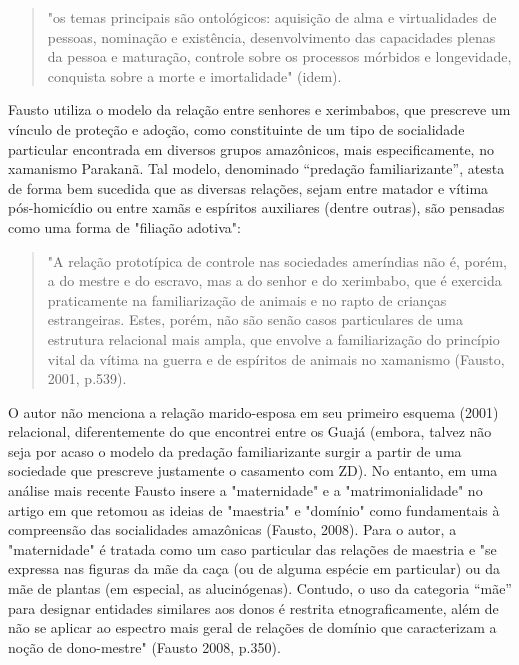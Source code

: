 \begin{quote}
"os temas principais são ontológicos: aquisição de alma e virtualidades
de pessoas, nominação e existência, desenvolvimento das capacidades
plenas da pessoa e maturação, controle sobre os processos mórbidos e
longevidade, conquista sobre a morte e imortalidade" (idem).
\end{quote}

Fausto utiliza o modelo da relação entre senhores e xerimbabos, que
prescreve um vínculo de proteção e adoção, como constituinte de um tipo
de socialidade particular encontrada em diversos grupos amazônicos, mais
especificamente, no xamanismo Parakanã. Tal modelo, denominado
``predação familiarizante'', atesta de forma bem sucedida que as
diversas relações, sejam entre matador e vítima pós-homicídio ou entre
xamãs e espíritos auxiliares (dentre outras), são pensadas como uma
forma de "filiação adotiva":

\begin{quote}
"A relação prototípica de controle nas sociedades ameríndias não é,
porém, a do mestre e do escravo, mas a do senhor e do xerimbabo, que é
exercida praticamente na familiarização de animais e no rapto de
crianças estrangeiras. Estes, porém, não são senão casos particulares de
uma estrutura relacional mais ampla, que envolve a familiarização do
princípio vital da vítima na guerra e de espíritos de animais no
xamanismo (Fausto, 2001, p.539).
\end{quote}

O autor não menciona a relação marido-esposa em seu primeiro esquema
(2001) relacional, diferentemente do que encontrei entre os Guajá
(embora, talvez não seja por acaso o modelo da predação familiarizante
surgir a partir de uma sociedade que prescreve justamente o casamento
com ZD). No entanto, em uma análise mais recente Fausto insere a
"maternidade" e a "matrimonialidade" no artigo em que retomou as ideias
de "maestria" e "domínio" como fundamentais à compreensão das
socialidades amazônicas (Fausto, 2008). Para o autor, a "maternidade" é
tratada como um caso particular das relações de maestria e "se expressa
nas figuras da mãe da caça (ou de alguma espécie em particular) ou da
mãe de plantas (em especial, as alucinógenas). Contudo, o uso da
categoria ``mãe'' para designar entidades similares aos donos é restrita
etnograficamente, além de não se aplicar ao espectro mais geral de
relações de domínio que caracterizam a noção de dono-mestre" (Fausto
2008, p.350).

